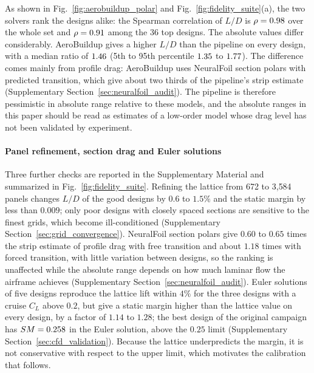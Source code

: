 As shown in Fig.~\ref{fig:aerobuildup_polar} and Fig.~\ref{fig:fidelity_suite}(a), the two solvers rank the designs alike: the Spearman correlation of $L/D$ is $\rho = 0.98$ over the whole set and $\rho = 0.91$ among the 36 top designs. The absolute values differ considerably. AeroBuildup gives a higher $L/D$ than the pipeline on every design, with a median ratio of $1.46$ (5th to 95th percentile $1.35$ to $1.77$). The difference comes mainly from profile drag: AeroBuildup uses NeuralFoil section polars with predicted transition, which give about two thirds of the pipeline's strip estimate (Supplementary Section~\ref{sec:neuralfoil_audit}). The pipeline is therefore pessimistic in absolute range relative to these models, and the absolute ranges in this paper should be read as estimates of a low-order model whose drag level has not been validated by experiment.

\paragraph{Panel refinement, section drag and Euler solutions} Three further checks are reported in the Supplementary Material and summarized in Fig.~\ref{fig:fidelity_suite}. Refining the lattice from 672 to 3{,}584 panels changes $L/D$ of the good designs by $0.6$ to $1.5\%$ and the static margin by less than $0.009$; only poor designs with closely spaced sections are sensitive to the finest grids, which become ill-conditioned (Supplementary Section~\ref{sec:grid_convergence}). NeuralFoil section polars give $0.60$ to $0.65$ times the strip estimate of profile drag with free transition and about $1.18$ times with forced transition, with little variation between designs, so the ranking is unaffected while the absolute range depends on how much laminar flow the airframe achieves (Supplementary Section~\ref{sec:neuralfoil_audit}). Euler solutions of five designs reproduce the lattice lift within $4\%$ for the three designs with a cruise $C_L$ above $0.2$, but give a static margin higher than the lattice value on every design, by a factor of $1.14$ to $1.28$; the best design of the original campaign has $SM = 0.258$ in the Euler solution, above the $0.25$ limit (Supplementary Section~\ref{sec:cfd_validation}). Because the lattice underpredicts the margin, it is not conservative with respect to the upper limit, which motivates the calibration that follows.

